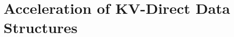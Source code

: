 \chapter{Acceleration of KV-Direct Data Structures}
\label{chapter:kvdirect}

\def\name{KV-Direct}
\def\fullname{Remote Direct Key-Value Access}
\def\sysname{}

\newcommand{\specialcell}[2][c]{%
  \begin{tabular}[#1]{@{}c@{}}#2\end{tabular}}




%




